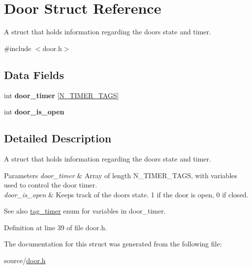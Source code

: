 \hypertarget{structDoor}{}\section{Door Struct Reference}
\label{structDoor}


A struct that holds information regarding the door\textquotesingle{}s state and timer.  




{\ttfamily \#include $<$door.\+h$>$}

\subsection*{Data Fields}
\begin{DoxyCompactItemize}
\item 
\mbox{\label{structDoor_a0336f54888db4744c4a6923e06947fcd}} 
int {\bfseries door\+\_\+timer} \mbox{[}\mbox{\hyperlink{door_8h_a4805ac658f5672fc7f938a3622962948ad1344d700843c27bf39b37c07a5426fd}{N\+\_\+\+T\+I\+M\+E\+R\+\_\+\+T\+A\+GS}}\mbox{]}
\item 
\mbox{\label{structDoor_a7e103b2e2527ecdead0dfd1f07366de9}} 
int {\bfseries door\+\_\+is\+\_\+open}
\end{DoxyCompactItemize}


\subsection{Detailed Description}
A struct that holds information regarding the door\textquotesingle{}s state and timer. 


\begin{DoxyParams}{Parameters}
{\em door\+\_\+timer} & Array of length N\+\_\+\+T\+I\+M\+E\+R\+\_\+\+T\+A\+GS, with variables used to control the door timer. \\
\hline
{\em door\+\_\+is\+\_\+open} & Keeps track of the door\textquotesingle{}s state. 1 if the door is open, 0 if closed. \\
\hline
\end{DoxyParams}
\begin{DoxySeeAlso}{See also}
\mbox{\hyperlink{door_8h_a4805ac658f5672fc7f938a3622962948}{tag\+\_\+timer}} enum for variables in {\ttfamily door\+\_\+timer}. 
\end{DoxySeeAlso}


Definition at line 39 of file door.\+h.



The documentation for this struct was generated from the following file\+:\begin{DoxyCompactItemize}
\item 
source/\mbox{\hyperlink{door_8h}{door.\+h}}\end{DoxyCompactItemize}
